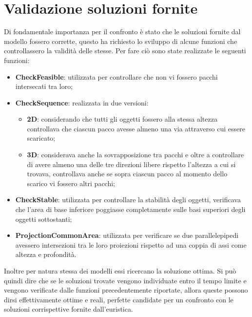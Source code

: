 \section{Validazione soluzioni fornite}
Di fondamentale importanza per il confronto è stato che le soluzioni fornite dal modello fossero corrette, questo ha richiesto lo sviluppo di alcune funzioni che controllassero la validità delle stesse. 
\newpage
Per fare ciò sono state realizzate le seguenti funzioni:
\begin{itemize}
	\item \textbf{CheckFeasible}: utilizzata per controllare che non vi fossero pacchi intersecati tra loro;
	\item \textbf{CheckSequence}: realizzata in due versioni:
	      \begin{itemize}
	      	\item \textbf{2D}: considerando che tutti gli oggetti fossero alla stessa altezza controllava che ciascun pacco avesse almeno una via attraverso cui essere scaricato;
	      	\item \textbf{3D}: considerava anche la sovrapposizione tra pacchi e oltre a controllare di avere almeno una delle tre direzioni libere rispetto l'altezza a cui si trovava, controllava anche se sopra ciascun pacco al momento dello scarico vi fossero altri pacchi;
	      \end{itemize}
	\item \textbf{CheckStable}: utilizzata per controllare la stabilità degli oggetti, verificava che l'area di base inferiore poggiasse completamente sulle basi superiori degli oggetti sottostanti;
	\item \textbf{ProjectionCommonArea}: utilizzata per verificare se due parallelepipedi avessero intersezioni tra le loro proiezioni rispetto ad una coppia di assi come altezza e profondità.
\end{itemize}

Inoltre per natura stessa dei modelli essi ricercano la soluzione ottima. Si può quindi dire che se le soluzioni trovate vengono individuate entro il tempo limite e vengono verificate dalle funzioni precedentemente riportate, allora queste possono dirsi effettivamente ottime e reali, perfette candidate per un confronto con le soluzioni corrispettive fornite dall'euristica.